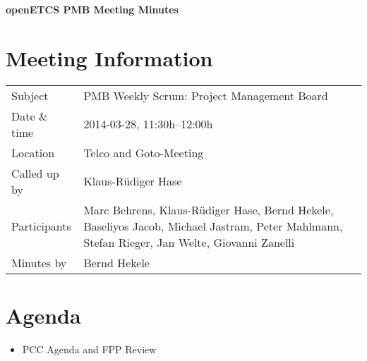 \documentclass[a4paper, 11pt]{article}
\begin{document}
{\begin{center}\huge\bf openETCS PMB Meeting Minutes\end{center}}
\section{Meeting Information}

\renewcommand{\arraystretch}{1.5}
\begin{supertabular}{m{.2\textwidth}m{.8\textwidth}}
Subject & PMB Weekly Scrum: Project Management Board\\
Date \& time & 2014-03-28, 11:30h--12:00h\\
Location & Telco and Goto-Meeting\\
Called up by & Klaus-R\"udiger Hase\\
Participants &
Marc Behrens,
Klaus-R\"udiger Hase,
Bernd Hekele,
Baseliyos Jacob,
Michael Jastram,
Peter Mahlmann,
Stefan Rieger,
Jan Welte,
Giovanni Zanelli
\\

Minutes by & Bernd Hekele\\

\end{supertabular}
\renewcommand{\arraystretch}{1.0}


\section{{Agenda}}

\begin{itemize}
\item PCC Agenda and FPP Review
\end{itemize}
\end{document}
